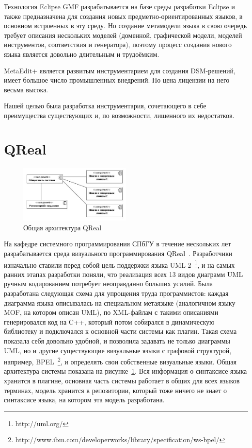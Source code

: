 \documentclass[a4paper]{article}
\begin{document}
Технология Eclipse GMF разрабатывается на базе среды разработки Eclipse и также предназначена для создания новых предметно-ориентированных языков, в основном встроенных в эту среду. Но создание метамодели языка в свою очередь требует описания нескольких моделей (доменной, графической модели, моделей инструментов, соответствия и генератора), поэтому процесс создания нового языка является довольно длительным и трудоёмким.

MetaEdit+ является развитым инструментарием для создания DSM-решений, имеет большое число промышленных внедрений. Но цена лицензии на него весьма высока.

Нашей целью была разработка инструментария, сочетающего в себе преимущества существующих и, по возможности, лишенного их недостатков.

\section{QReal}

\begin{figure}
  \begin{center}
    \includegraphics[width=0.5\textwidth]{architecture.jpg}
    \caption{Общая архитектура QReal}
    \label{architecture}
  \end{center}
\end{figure}

На кафедре системного программирования СПбГУ в течение нескольких лет разрабатывается среда визуального программирования QReal~\cite{qReal}. Разработчики изначально ставили перед собой цель поддержки языка UML 2~\footnote{http://uml.org/}, и на самых ранних этапах разработки поняли, что реализация всех 13 видов диаграмм UML ручным кодированием потребует неоправданно больших усилий. Была разработана следующая схема для упрощения труда программистов: каждая диаграмма языка описывалась на специальном метаязыке (аналогичном языку MOF, на котором описан UML), по XML-файлам с такими описаниями генерировался код на C++, который потом собирался в динамическую библиотеку и подключался к основной части системы как плагин. Такая схема показала себя довольно удобной, и позволила задавать не только диаграммы UML, но и другие существующие визуальные языки с графовой структурой, например, BPEL~\footnote{http://www.ibm.com/developerworks/library/specification/ws-bpel/}, и определять свои собственные визуальные языки. Общая архитектура системы показана на рисунке~\ref{architecture}. Вся информация о синтаксисе языка хранится в плагине, основная часть системы работает в общих для всех языков терминах, модель хранится в репозитории, который тоже ничего не знает о синтаксисе языка, на котором эта модель разработана.
\end{document}
